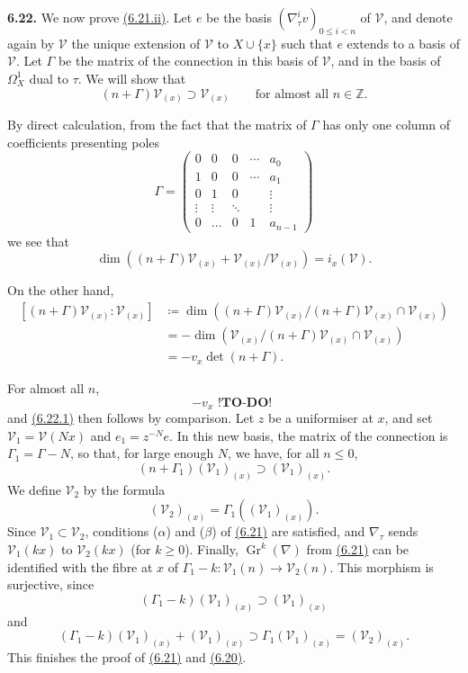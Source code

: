 \documentclass{report}
\newenvironment{rmenv}[1]
  {\phantomsection\par\medskip\noindent\textbf{#1.}\rmfamily}
  {\par\medskip}
\renewcommand{\cal}[1]{{\mathcal{#1}}}
\newcommand{\ZZ}{\mathbb{Z}}
\renewcommand{\geq}{\geqslant}
\renewcommand{\leq}{\leqslant}
\DeclareMathOperator{\Gr}{Gr}
\newcommand{\todo}{\textbf{ !TO-DO! }}
\newcommand{\oldpage}[1]{\marginpar{\footnotesize$\Big\vert$ \textit{p.~#1}}}
\begin{document}
\begin{rmenv}{6.22}
\label{II.6.22}
  We now prove \hyperref[II.6.21]{(6.21.ii)}.
  Let $e$ be the basis $(\nabla_\tau^i v)_{0\leq i<n}$ of $\cal{V}$, and denote again by $\cal{V}$ the unique extension of $\cal{V}$ to $X\cup\{x\}$ such that $e$ extends to a basis of $\cal{V}$.
  Let $\Gamma$ be the matrix of the connection in this basis of $\cal{V}$, and in the basis of $\Omega_X^1$ dual to $\tau$.
  We will show that
  \[
  \label{II.6.22.1}
    (n+\Gamma)\cal{V}_{(x)} \supset \cal{V}_{(x)}
    \qquad\mbox{for almost all $n\in\ZZ$.}
  \tag{6.22.1}
  \]

  By direct calculation, from the fact that the matrix of $\Gamma$ has only one column of coefficients presenting poles
  \[
    \Gamma =
    \begin{pmatrix}
      0 & 0 & 0 & \cdots & a_0
    \\1 & 0 & 0 & \cdots & a_1
    \\0 & 1 & 0 & & \vdots
    \\\vdots & \vdots & \ddots & & \vdots
    \\0 & \ldots & 0 & 1 & a_{n-1}
    \end{pmatrix}
  \]
  \oldpage{112}
  we see that
  \[
    \dim\left((n+\Gamma)\cal{V}_{(x)} + \cal{V}_{(x)}/\cal{V}_{(x)}\right)
    = i_x(\cal{V}).
  \]

  On the other hand,
  \[
    \begin{aligned}
      \left[(n+\Gamma)\cal{V}_{(x)} : \cal{V}_{(x)}\right]
      &\coloneqq \dim\left((n+\Gamma)\cal{V}_{(x)}/(n+\Gamma)\cal{V}_{(x)}\cap\cal{V}_{(x)}\right)
    \\&= -\dim\left(\cal{V}_{(x)}/(n+\Gamma)\cal{V}_{(x)}\cap\cal{V}_{(x)}\right)
    \\&= -v_x\det(n+\Gamma).
    \end{aligned}
  \]

  For almost all $n$,
  \[
    -v_x \todo
  \]
  and \hyperref[II.6.22.1]{(6.22.1)} then follows by comparison.
  Let $z$ be a uniformiser at $x$, and set $\cal{V}_1=\cal{V}(Nx)$ and $e_1=z^{-N}e$.
  In this new basis, the matrix of the connection is $\Gamma_1=\Gamma-N$, so that, for large enough $N$, we have, for all $n\leq0$,
  \[
    (n+\Gamma_1)(\cal{V}_1)_{(x)} \supset (\cal{V}_1)_{(x)}.
  \]
  We define $\cal{V}_2$ by the formula
  \[
    (\cal{V}_2)_{(x)} = \Gamma_1((\cal{V}_1)_{(x)}).
  \]
  Since $\cal{V}_1\subset\cal{V}_2$, conditions ($\alpha$) and ($\beta$) of \hyperref[II.6.21]{(6.21)} are satisfied, and $\nabla_\tau$ sends $\cal{V}_1(kx)$ to $\cal{V}_2(kx)$ (for $k\geq0$).
  Finally, $\Gr^k(\nabla)$ from \hyperref[II.6.21]{(6.21)} can be identified with the fibre at $x$ of $\Gamma_1-k\colon\cal{V}_1(n)\to\cal{V}_2(n)$.
  This morphism is surjective, since
  \[
    (\Gamma_1-k)(\cal{V}_1)_{(x)} \supset (\cal{V}_1)_{(x)}
  \]
  and
  \[
    (\Gamma_1-k)(\cal{V}_1)_{(x)} + (\cal{V}_1)_{(x)}
    \supset \Gamma_1(\cal{V}_1)_{(x)} = (\cal{V}_2)_{(x)}.
  \]
  This finishes the proof of \hyperref[II.6.21]{(6.21)} and \hyperref[II.6.20]{(6.20)}.
\end{rmenv}
\end{document}
